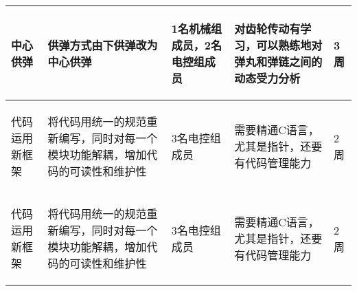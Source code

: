 \begin{longtable}{ p{2cm} | p{3cm} | p{3cm} | p{4.8cm} | p{2cm} |}
    \hline
    
        \begin{center}
            中心供弹
        \end{center} &
        \begin{center}
            供弹方式由下供弹改为中心供弹
        \end{center} &
        \begin{center}
            1名机械组成员，2名电控组成员
        \end{center} &
        \begin{center}
            对齿轮传动有学习，可以熟练地对弹丸和弹链之间的动态受力分析
        \end{center} &
        \begin{center}
            3周
        \end{center}\\

    \hline
    
        \begin{center}
            代码运用新框架
        \end{center} &
        \begin{center}
            将代码用统一的规范重新编写，同时对每一个模块功能解耦，增加代码的可读性和维护性
        \end{center} &
        \begin{center}
            3名电控组成员
        \end{center} &
        \begin{center}
            需要精通C语言，尤其是指针，还要有代码管理能力
        \end{center} &
        \begin{center}
            2周
        \end{center} \\
        
    \hline
    
        \begin{center}
            代码运用新框架
        \end{center} &
        \begin{center}
            将代码用统一的规范重新编写，同时对每一个模块功能解耦，增加代码的可读性和维护性
        \end{center} &
        \begin{center}
            3名电控组成员
        \end{center} &
        \begin{center}
            需要精通C语言，尤其是指针，还要有代码管理能力
        \end{center} &
        \begin{center}
            2周
        \end{center} \\


\end{longtable}
